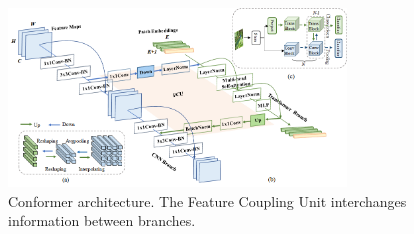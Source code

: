 \begin{figure}[t]
    \centering
    \includegraphics[width=0.8\textwidth]{fig/rel/images/conformer.png}
    \caption{Conformer architecture. The Feature Coupling Unit interchanges information between branches.}
    \label{fig:rel_conformer}
\end{figure}